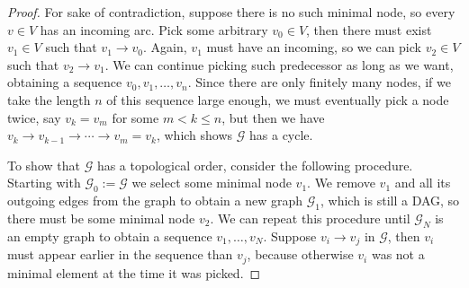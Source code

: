 \documentclass{report}
\theoremstyle{definition}
\theoremstyle{plain}
\begin{document}


\label{app:misc}

\minimalnode*
\begin{proof}
  For sake of contradiction, suppose there is no such minimal node, so every
  $v \in V$ has an incoming arc. Pick some arbitrary $v_0 \in V$, then there
  must exist $v_1 \in V$ such that $v_1 \rightarrow v_0$. Again, $v_1$ must have
  an incoming, so we can pick $v_2 \in V$ such that $v_2 \rightarrow v_1$. We
  can continue picking such predecessor as long as we want, obtaining a sequence
  $v_0, v_1, \dots, v_n$. Since there are only finitely many nodes, if we take
  the length $n$ of this sequence large enough, we must eventually pick a node
  twice, say $v_k = v_m$ for some $m < k \leq n$, but then we have
  $v_k \rightarrow v_{k-1} \rightarrow \cdots \rightarrow v_m = v_k$, which
  shows $\mathcal{G}$ has a cycle.

  To show that $\mathcal{G}$ has a topological order, consider the following
  procedure. Starting with $\mathcal{G}_0 := \mathcal{G}$ we select some minimal
  node $v_1$. We remove $v_1$ and all its outgoing edges from the graph to
  obtain a new graph $\mathcal{G}_1$, which is still a DAG, so there must be
  some minimal node $v_2$. We can repeat this procedure until
  $\mathcal{G}_{N}$ is an empty graph to obtain a sequence $v_1, \dots, v_N$.
  Suppose $v_i \rightarrow v_j$ in $\mathcal{G}$, then $v_i$ must appear earlier
  in the sequence than $v_j$, because otherwise $v_i$ was not a minimal element
  at the time it was picked.
\end{proof}
\end{document}
